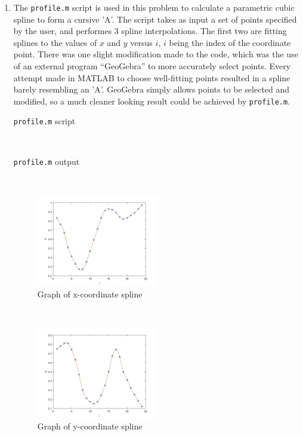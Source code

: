 \documentclass[11pt]{article}
\begin{document}
\begin{enumerate}
	\item The \texttt{profile.m} script is used in this problem to calculate a parametric cubic spline to form a cursive 'A'. The script
		takes as input a set of points specified by the user, and performes 3 spline interpolations. The first two are fitting splines
		to the values of $x$ and $y$ versus $i$, $i$ being the index of the coordinate point. There was one slight modification made
		to the code, which was the use of an external program ``GeoGebra'' to more accurately select points. Every attempt made in
		MATLAB to choose well-fitting points resulted in a spline barely resembling an 'A'. GeoGebra simply allows points to be
		selected and modified, so a much cleaner looking result could be achieved by \texttt{profile.m}. \\

		\begin{center}
			\texttt{profile.m} script
		\end{center}
		 \

		\begin{center}
			\texttt{profile.m} output
		\end{center}
		 \

		\begin{figure}[H]
			\centering
			\includegraphics[width=0.5\textwidth]{profile_sx.png}
			\caption{Graph of x-coordinate spline}
		\end{figure} \

		\begin{figure}[H]
			\centering
			\includegraphics[width=0.5\textwidth]{profile_sy.png}
			\caption{Graph of y-coordinate spline}
		\end{figure} \


\end{enumerate}
\end{document}
